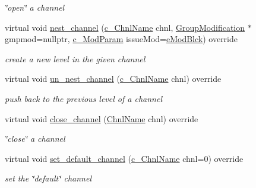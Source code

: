 \begin{Indent}
\begin{DoxyCompactItemize}
\begin{DoxyCompactList}\small\item\em \char`\"{}open\char`\"{} a channel \end{DoxyCompactList}\item 
virtual void \mbox{\hyperlink{class_s_m_spp__di__unipi__it_1_1_block_ae8c20577eae73143d71b37b1550c1e93}{nest\+\_\+channel}} (\mbox{\hyperlink{class_s_m_spp__di__unipi__it_1_1_observer_aa9ad8de42ffaf90023bfed5c085ad8bc}{c\+\_\+\+Chnl\+Name}} chnl, \mbox{\hyperlink{class_s_m_spp__di__unipi__it_1_1_group_modification}{Group\+Modification}} $\ast$gmpmod=nullptr, \mbox{\hyperlink{group___modification___t_y_p_e_s_ga544246d8c462e9a2d817c2c30797968f}{c\+\_\+\+Mod\+Param}} issue\+Mod=\mbox{\hyperlink{group___modification___t_y_p_e_s_gga48fddcdd03a03f49b7e389ca1ed938d4a21b14b26b1c0093a0905f6fc010bad29}{e\+Mod\+Blck}}) override
\begin{DoxyCompactList}\small\item\em create a new level in the given channel \end{DoxyCompactList}\item 
virtual void \mbox{\hyperlink{class_s_m_spp__di__unipi__it_1_1_block_a8f87b193f9ae85d75ed4a3ab798e6fe0}{un\+\_\+nest\+\_\+channel}} (\mbox{\hyperlink{class_s_m_spp__di__unipi__it_1_1_observer_aa9ad8de42ffaf90023bfed5c085ad8bc}{c\+\_\+\+Chnl\+Name}} chnl) override
\begin{DoxyCompactList}\small\item\em push back to the previous level of a channel \end{DoxyCompactList}\item 
virtual void \mbox{\hyperlink{class_s_m_spp__di__unipi__it_1_1_block_ae6ecad455eb1f431127411f27b5eb10f}{close\+\_\+channel}} (\mbox{\hyperlink{class_s_m_spp__di__unipi__it_1_1_observer_a54ce8db639626e45b1f20c289baa989b}{Chnl\+Name}} chnl) override
\begin{DoxyCompactList}\small\item\em \char`\"{}close\char`\"{} a channel \end{DoxyCompactList}\item 
virtual void \mbox{\hyperlink{class_s_m_spp__di__unipi__it_1_1_block_ae1e61f1d3f7185b6824f02488901a0ad}{set\+\_\+default\+\_\+channel}} (\mbox{\hyperlink{class_s_m_spp__di__unipi__it_1_1_observer_aa9ad8de42ffaf90023bfed5c085ad8bc}{c\+\_\+\+Chnl\+Name}} chnl=0) override
\begin{DoxyCompactList}\small\item\em set the \char`\"{}default\char`\"{} channel \end{DoxyCompactList}\end{DoxyCompactItemize}
\end{Indent}
